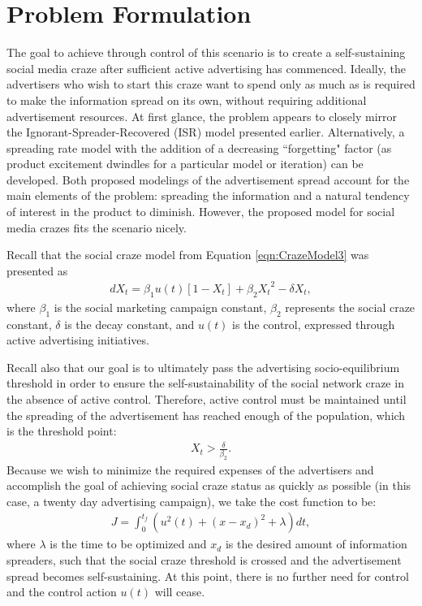 \section{Problem Formulation}
The goal to achieve through control of this scenario is to create a self-sustaining social media craze after sufficient active advertising has commenced. Ideally, the advertisers who wish to start this craze want to spend only as much as is required to make the information spread on its own, without requiring additional advertisement resources. At first glance, the problem appears to closely mirror the Ignorant-Spreader-Recovered (ISR) model presented earlier. Alternatively, a spreading rate model with the addition of a decreasing ``forgetting" factor (as product excitement dwindles for a particular model or iteration) can be developed. Both proposed modelings of the advertisement spread account for the main elements of the problem: spreading the information and a natural tendency of interest in the product to diminish. However, the proposed model for social media crazes fits the scenario nicely. 

Recall that the social craze model from Equation \ref{eqn:CrazeModel3} was presented as
\begin{equation}
\left.\begin{aligned}
dX_t=\beta_1 u(t)[1-X_t] + \beta_2 {X_{t}}^{2}-\delta X_t, \nonumber
\end{aligned}\right.
\end{equation}
\noindent where $\beta_1$ is the social marketing campaign constant, $\beta_2$ represents the social craze constant, $\delta$ is the decay constant, and $u(t)$ is the control, expressed through active advertising initiatives.

Recall also that our goal is to ultimately pass the advertising socio-equilibrium threshold in order to ensure the self-sustainability of the social network craze in the absence of active control. Therefore, active control must be maintained until the spreading of the advertisement has reached enough of the population, which is the threshold point:
\begin{equation}
\left.\begin{aligned}
X_t > \frac{\delta}{\beta_2}. \nonumber
\end{aligned}\right.
\end{equation}
Because we wish to minimize the required expenses of the advertisers and accomplish the goal of achieving social craze status as quickly as possible (in this case, a twenty day advertising campaign), we take the cost function to be:
\begin{equation}
\left.\begin{aligned}
J=\int_{0}^{t_f}(u^2(t)+(x-x_d)^2 + \lambda )dt,
\end{aligned}\right.
\end{equation}
\noindent where $\lambda$ is the time to be optimized and $x_d$ is the desired amount of information spreaders, such that the social craze threshold is crossed and the advertisement spread becomes self-sustaining. At this point, there is no further need for control and the control action $u(t)$ will cease.


